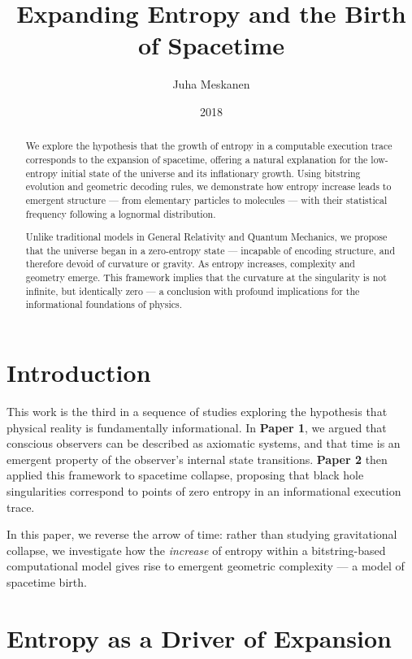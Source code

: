 \documentclass[11pt]{article}
\title{Expanding Entropy and the Birth of Spacetime}
\author{Juha Meskanen}
\date{2018}
\begin{document}
\maketitle

\begin{abstract}
   We explore the hypothesis that the growth of entropy in a computable execution trace corresponds to the expansion of spacetime, offering a natural explanation for the low-entropy initial state of the universe and its inflationary growth. Using bitstring evolution and geometric decoding rules, we demonstrate how entropy increase leads to emergent structure — from elementary particles to molecules — with their statistical frequency following a lognormal distribution.

   Unlike traditional models in General Relativity and Quantum Mechanics, we propose that the universe began in a zero-entropy state — incapable of encoding structure, and therefore devoid of curvature or gravity. As entropy increases, complexity and geometry emerge. This framework implies that the curvature at the singularity is not infinite, but identically zero — a conclusion with profound implications for the informational foundations of physics.
\end{abstract}


\section{Introduction}

This work is the third in a sequence of studies exploring the hypothesis that physical reality is fundamentally informational. In \textbf{Paper 1}, we argued that conscious observers can be described as axiomatic systems, and that time is an emergent property of the observer’s internal state transitions. \textbf{Paper 2} then applied this framework to spacetime collapse, proposing that black hole singularities correspond to points of zero entropy in an informational execution trace.

In this paper, we reverse the arrow of time: rather than studying gravitational collapse, we investigate how the \textit{increase} of entropy within a bitstring-based computational model gives rise to emergent geometric complexity — a model of spacetime birth.


\section{Entropy as a Driver of Expansion}
\end{document}
